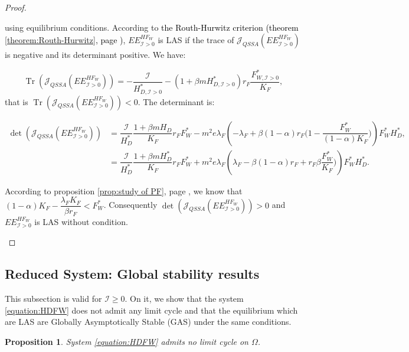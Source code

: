 \documentclass{article}
\newcommand{\lfw}{\lambda_{F}}
\newcommand{\lfw}{\lambda_{F}}
\newcommand{\cI}{\mathcal{I}}
\newcommand{\vdeux}[1]{\textcolor{black}{#1}}
\DeclareMathOperator{\Tr}{Tr}
\newtheorem{prop}[theorem]{Proposition}
\theoremstyle{definition}
\theoremstyle{remark}
\begin{document}
\begin{proof}
\begin{itemize}
using equilibrium conditions.  According to \vdeux{the Routh-Hurwitz criterion (theorem \ref{theorem:Routh-Hurwitz}, page \pageref{theorem:Routh-Hurwitz})},  $EE^{HF_W}_{\cI > 0}$ is LAS if the trace of $\mathcal{J}_{QSSA}(EE^{HF_W}_{\cI > 0}) $ is negative and its determinant positive. We have:

\begin{equation*}
\Tr(\mathcal{J}_{QSSA}(EE^{HF_W}_{\cI > 0})) = -\dfrac{\cI}{H^*_{D, \cI > 0}} -(1+\beta m H^*_{D, \cI > 0}) r_F \dfrac{F^*_{W, \cI > 0}}{K_F}, 
\end{equation*}
that is $\Tr(\mathcal{J}_{QSSA}(EE^{HF_W}_{\cI > 0})) < 0$.
The determinant is:

\begin{align*}
\det(\mathcal{J}_{QSSA}(EE^{HF_W}_{\cI > 0})) &= \dfrac{\cI}{H_D^*} \dfrac{1 + \beta m H_D}{K_F} r_F F_W^* - m^2 e \lfw \left(-\lfw + \beta(1-\alpha)r_F \Big(1- \dfrac{F_W^*}{(1-\alpha) K_F} \Big) \right) F_W^* H_D^*, \\
&= \dfrac{\cI}{H_D^*} \dfrac{1 + \beta m H_D^*}{K_F} r_F F_W^* + m^2 e \lfw \left(\lfw - \beta(1-\alpha)r_F + r_F \beta\dfrac{F_W^*}{ K_F} \Big) \right) F_W^* H_D^*.
\end{align*}

According to proposition \ref{prop:study of PF}, page \pageref{prop:study of PF}, we know that $(1-\alpha)K_F - \dfrac{\lfw K_F}{\beta r_F} < F_W^*$. Consequently $\det(\mathcal{J}_{QSSA}(EE^{HF_W}_{\cI > 0})) > 0$ and $EE^{HF_W}_{\cI > 0}$ is LAS without condition.
\end{itemize}
\end{proof}

\subsection{Reduced System: Global stability results}
This subsection is valid for $\cI \geq 0$. On it, we show that the system \eqref{equation:HDFW} does not admit any limit cycle and that the equilibrium which are LAS are Globally Asymptotically Stable (GAS) under the same conditions.  

\begin{prop} \label{prop:no limit cycle, 2D}
System \eqref{equation:HDFW} admits no limit cycle on $\Omega$.
\end{prop}
\end{document}
